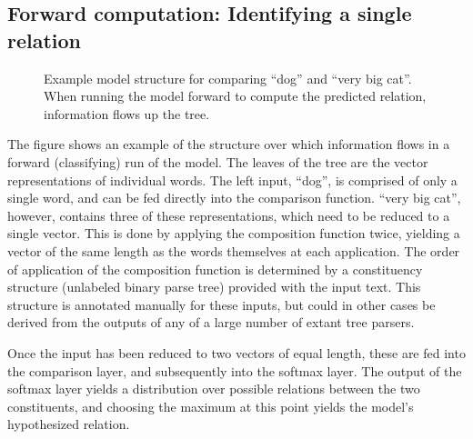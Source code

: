 \documentclass[10pt,letterpaper]{article}
\begin{document}
\subsection{Forward computation: Identifying a single relation}

\begin{figure}[ht]
\begin{center}
\end{center}
\caption{Example model structure for comparing ``dog'' and ``very big cat''. When running the model forward to compute the predicted relation, information flows up the tree.} 
\label{sample-figure}
\end{figure}

The figure shows an example of the structure over which information flows in a forward (classifying) run of the model. The leaves of the tree are the vector representations of individual words. The left input, ``dog'', is comprised of only a single word, and can be fed directly into the comparison function. ``very big cat'', however, contains three of these representations, which need to be reduced to a single vector. This is done by applying the composition function twice, yielding a vector of the same length as the words themselves at each application. The order of application of the composition function is determined by a constituency structure (unlabeled binary parse tree) provided with the input text. This structure is annotated manually for these inputs, but could in other cases be derived from the outputs of any of a large number of extant tree parsers.

Once the input has been reduced to two vectors of equal length, these are fed into the comparison layer, and subsequently into the softmax layer. The output of the softmax layer yields a distribution over possible relations between the two constituents, and choosing the maximum at this point yields the model's hypothesized relation.
\end{document}
